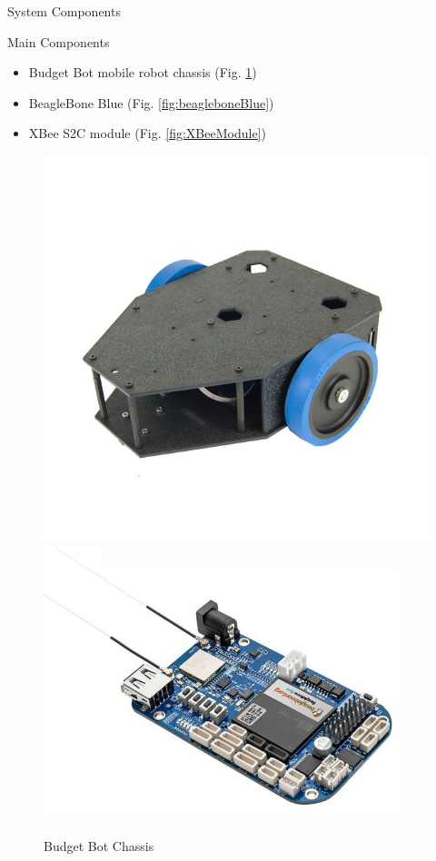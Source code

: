\documentclass{beamer}
\begin{document}
\begin{frame}{System Components}
  \begin{block}{Main Components}
    \begin{itemize}
      \item Budget Bot mobile robot chassis (Fig. \ref{fig:budgetBotChassis})
      \item BeagleBone Blue (Fig. \ref{fig:beagleboneBlue})
      \item XBee S2C module (Fig. \ref{fig:XBeeModule})
    \end{itemize}
  \end{block}
  \begin{figure}
    \centering
    \begin{minipage}[t]{0.32\textwidth}
      \includegraphics[width=1\textwidth]{figs/img/budgetbot_chassis}
      \caption{Budget Bot Chassis}
      \label{fig:budgetBotChassis}
    \end{minipage}%
    \begin{minipage}[t]{0.32\textwidth}
      \includegraphics[width=1\textwidth]{figs/img/beaglebone_blue}

\end{minipage}
\end{figure}
\end{frame}
\end{document}
